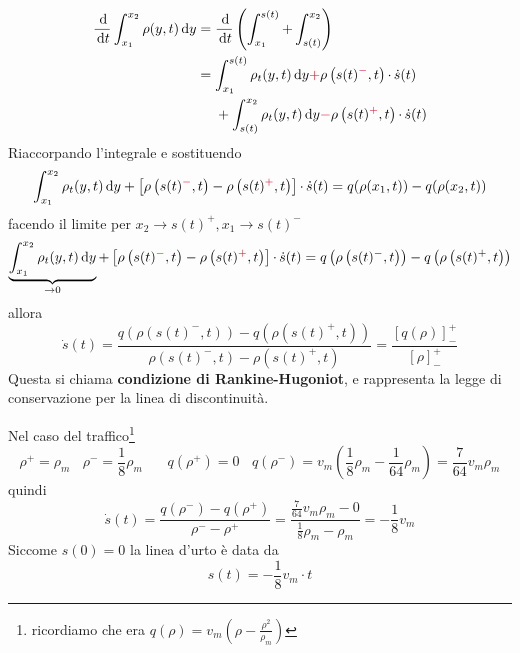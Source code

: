 \documentclass[10pt,a4paper,twoside,openright]{book}
\newcommand{\de}{\,\mathrm d}
\newcommand{\dy}{\de y}
\newcommand{\dt}{\de t}
\begin{document}
\begin{align*}
    \frac{\de}{\dt}\int ^{x_{2}}_{x_{1}} \rho (y,t) \dy & =\frac{\de}{\dt}\left(\int ^{s(t)}_{x_{1}} +\int ^{x_{2}}_{s(t)}\right)                                                                                             \\
                                                        & =\int ^{s(t)}_{x_{1}} \rho _{t}(y,t) \dy\textcolor[rgb]{0.82,0.01,0.11}{+} \rho \left(s(t)\textcolor[rgb]{0.82,0.01,0.11}{^{-}} ,t\right) \cdotp \dot{s}(t)         \\
                                                        & \ \ \ \ +\int ^{x_{2}}_{s(t)} \rho _{t}(y,t) \dy\textcolor[rgb]{0.82,0.01,0.11}{-} \rho \left(s(t)\textcolor[rgb]{0.82,0.01,0.11}{^{+}} ,t\right) \cdotp \dot{s}(t)
\end{align*}
Riaccorpando l'integrale e sostituendo
\begin{equation*}
    \int ^{x_{2}}_{x_{1}} \rho _{t}(y,t) \dy+\left[ \rho \left(s(t)\textcolor[rgb]{0.82,0.01,0.11}{^{-}} ,t\right) -\rho \left(s(t)\textcolor[rgb]{0.82,0.01,0.11}{^{+}} ,t\right)\right] \cdotp \dot{s}(t) =q(\rho (x_{1} ,t)) -q(\rho (x_{2} ,t))
\end{equation*}
facendo il limite per $x_{2}\rightarrow s(t)^{+} ,x_{1}\rightarrow s(t)^{-}$
\begin{equation*}
    \underbrace{\int ^{x_{2}}_{x_{1}} \rho _{t}(y,t) \dy}_{\rightarrow 0} +\left[ \rho \left(s(t)\textcolor[rgb]{0.82,0.01,0.11}{^{-}} ,t\right) -\rho \left(s(t)\textcolor[rgb]{0.82,0.01,0.11}{^{+}} ,t\right)\right] \cdotp \dot{s}(t) =q\left(\rho \left(s(t)^{-} ,t\right)\right) -q\left(\rho \left(s(t)^{+} ,t\right)\right)
\end{equation*}
allora
\begin{equation}
    \dot{s}(t) =\frac{q\left(\rho \left(s(t)^{-} ,t\right)\right) -q\left(\rho \left(s(t)^{+} ,t\right)\right)}{\rho \left(s(t)^{-} ,t\right) -\rho \left(s(t)^{+} ,t\right)} =\frac{[ q(\rho)]^{+}_{-}}{[ \rho ]^{+}_{-}}
\end{equation}
Questa si chiama \textbf{condizione di Rankine-Hugoniot}, e rappresenta la legge di conservazione per la linea di discontinuità.

Nel caso del traffico\footnote{ricordiamo che era $q(\rho) =v_{m}\left(\rho -\frac{\rho ^{2}}{\rho _{m}}\right)$}
\begin{equation*}
    \rho ^{+} =\rho _{m} \ \ \ \ \rho ^{-} =\frac{1}{8} \rho _{m} \ \ \ \ \ \ \ \ q\left(\rho ^{+}\right) =0\ \ \ \ q\left(\rho ^{-}\right) =v_{m}\left(\frac{1}{8} \rho _{m} -\frac{1}{64} \rho _{m}\right) =\frac{7}{64} v_{m} \rho _{m}
\end{equation*}
quindi
\begin{equation*}
    \dot{s}(t) =\frac{q\left(\rho ^{-}\right) -q\left(\rho ^{+}\right)}{\rho ^{-} -\rho ^{+}} =\frac{\frac{7}{64} v_{m} \rho _{m} -0}{\frac{1}{8} \rho _{m} -\rho _{m}} =-\frac{1}{8} v_{m}
\end{equation*}
Siccome $s(0) =0$ la linea d'urto è data da
\begin{equation*}
    s(t) =-\frac{1}{8} v_{m} \cdotp t
\end{equation*}
\end{document}

